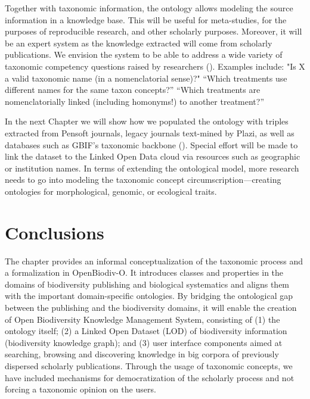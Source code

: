 Together with taxonomic information, the ontology allows modeling the source information in a knowledge base. This will be useful for meta-studies, for the purposes of reproducible research, and other scholarly purposes. Moreover, it will be an expert system as the knowledge extracted will come from scholarly publications. We envision the system to be able to address a wide variety of taxonomic competency questions raised by researchers (\cite{pro-ibiosphere_competency_2013}). Examples include: "Is X a valid taxonomic name (in a nomenclatorial sense)?" ``Which treatments use different names for the same taxon concepts?'' ``Which treatments are nomenclatorially linked (including homonyms!) to another treatment?''

In the next Chapter we will show how we populated the ontology with triples extracted from Pensoft journals, legacy journals text-mined by Plazi, as well as databases such as GBIF's taxonomic backbone (\cite{gbif_secretariat_gbif_2017}). Special effort will be made to link the dataset to the Linked Open Data cloud via resources such as geographic or institution names. In terms of extending the ontological model, more research needs to go into modeling the taxonomic concept circumscription---creating ontologies for morphological, genomic, or ecological traits. 

\section{Conclusions}

The chapter provides an informal conceptualization of the taxonomic process and a formalization in OpenBiodiv-O. It introduces classes and properties in the domains of biodiversity publishing and biological systematics and aligns them with the important domain-specific ontologies. By bridging the ontological gap between the publishing and the biodiversity domains, it will enable the creation of Open Biodiversity Knowledge Management System, consisting of (1) the ontology itself; (2) a Linked Open Dataset (LOD) of biodiversity information (biodiversity knowledge graph); and (3) user interface components aimed at searching, browsing and discovering knowledge in big corpora of previously dispersed scholarly publications. Through the usage of taxonomic concepts, we have included mechanisms for democratization of the scholarly process and not forcing a taxonomic opinion on the users.